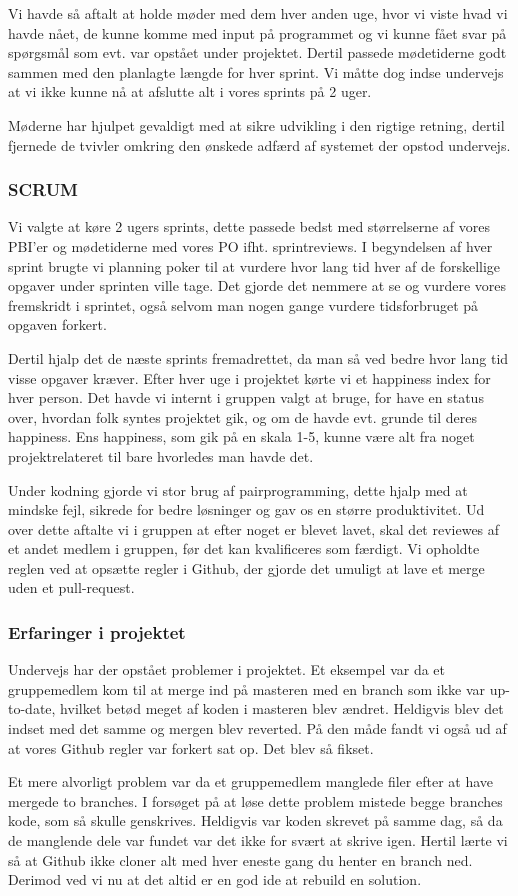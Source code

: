 Vi havde så aftalt at holde møder med dem hver anden uge, hvor vi viste hvad vi havde nået, de kunne komme med input på programmet og vi kunne fået svar på spørgsmål som evt. var opstået under projektet. Dertil passede mødetiderne godt sammen med den planlagte længde for hver sprint. 
Vi måtte dog indse undervejs at vi ikke kunne nå at afslutte alt i vores sprints på 2 uger.

Møderne har hjulpet gevaldigt med at sikre udvikling i den rigtige retning, dertil fjernede de tvivler omkring den ønskede adfærd af systemet der opstod undervejs. 

\subsubsection{SCRUM}

Vi valgte at køre 2 ugers sprints, dette passede bedst med størrelserne af vores PBI'er og mødetiderne med vores PO ifht. sprintreviews.
I begyndelsen af hver sprint brugte vi planning poker til at vurdere hvor lang tid hver af de forskellige opgaver under sprinten ville tage.
Det gjorde det nemmere at se og vurdere vores fremskridt i sprintet, også selvom man nogen gange vurdere tidsforbruget på opgaven forkert.

Dertil hjalp det de næste sprints fremadrettet, da man så ved bedre hvor lang tid visse opgaver kræver.
Efter hver uge i projektet kørte vi et happiness index for hver person.
Det havde vi internt i gruppen valgt
at bruge, for have en status over, hvordan folk syntes projektet gik, og om de havde evt. grunde til deres happiness.
Ens happiness, som gik på en skala 1-5, kunne være alt fra noget projektrelateret til bare hvorledes man havde det.

Under kodning gjorde vi stor brug af pairprogramming, dette hjalp med at mindske fejl, sikrede for bedre løsninger og gav os en større produktivitet.
Ud over dette aftalte vi i gruppen at efter noget er blevet lavet, 
skal det reviewes af et andet medlem i gruppen, før det kan kvalificeres som færdigt. Vi opholdte reglen ved at opsætte regler i Github, der gjorde det umuligt at lave et merge uden et pull-request.

\subsubsection{Erfaringer i projektet}

Undervejs har der opstået problemer i projektet. Et eksempel var da et gruppemedlem kom til at merge ind på masteren med en branch som ikke var up-to-date, hvilket betød meget af koden i masteren blev ændret. Heldigvis blev det indset med det samme og mergen blev reverted. På den måde fandt vi også ud af at vores Github regler var forkert sat op. Det blev så fikset.

Et mere alvorligt problem var da et gruppemedlem manglede filer efter at have mergede to branches. I forsøget på at løse dette problem mistede begge branches kode, som så skulle genskrives. Heldigvis var koden skrevet på samme dag, så da de manglende dele var fundet var det ikke for svært at skrive igen. Hertil lærte vi så at Github ikke cloner alt med hver eneste gang du henter en branch ned. Derimod ved vi nu at det altid er en god ide at rebuild en solution.